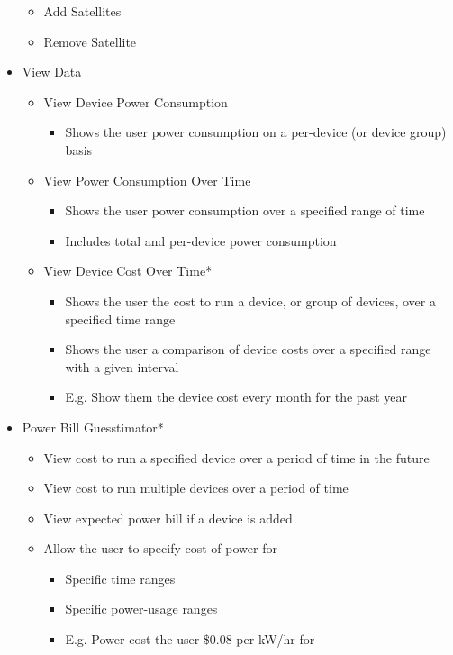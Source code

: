\begin{itemize}
\begin{itemize}
	 \item Add Satellites
	 \item Remove Satellite
	\end{itemize}
 \item View Data
	\begin{itemize}
	 \item View Device Power Consumption
		\begin{itemize}
		 \item Shows the user power consumption on a per-device (or device group) basis
		\end{itemize}
	 \item View Power Consumption Over Time
		\begin{itemize}
		 \item Shows the user power consumption over a specified range of time
		 \item Includes total and per-device power consumption
		\end{itemize}
	 \item View Device Cost Over Time*
		\begin{itemize}
		 \item Shows the user the cost to run a device, or group of devices, over a specified time range
		 \item Shows the user a comparison of device costs over a specified range with a given interval
		 \item E.g. Show them the device cost every month for the past year
		\end{itemize}
	\end{itemize}
 \item Power Bill Guesstimator*
	\begin{itemize}
	 \item View cost to run a specified device over a period of time in the future
	 \item View cost to run multiple devices over a period of time
	 \item View expected power bill if a device is added
	 \item Allow the user to specify cost of power for
	 \begin{itemize}
		\item Specific time ranges
		\item Specific power-usage ranges
		 \item E.g. Power cost the user \$0.08 per kW/hr for 

\end{itemize}
\end{itemize}
\end{itemize}
